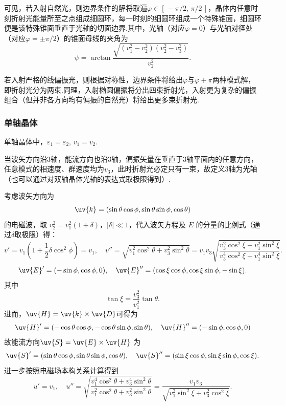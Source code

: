 可见，若入射自然光，则边界条件的解将取遍\(\varphi\in[\,-\pi/2,\,\pi/2\,]\)，晶体内任意时刻折射光能量所至之点组成细圆环，每一时刻的细圆环组成一个特殊锥面，细圆环便是该特殊锥面垂直于光轴的切面边界.其中，光轴（对应\(\varphi=0\)）与光轴对径处（对应\(\varphi=\pm\pi/2\)）的锥面母线的夹角为
\begin{equation*}
	\psi=\arctan\frac{\sqrt{(v_1^2 - v_2^2)(v_2^2 - v_3^2)}}{v_2^2 }.
\end{equation*}

若入射严格的线偏振光，则根据对称性，边界条件将给出\(\varphi\)与\(\varphi+\pi\)两种模式解，即折射光分为两束.同理，入射椭圆偏振将分出四束折射光，入射更为复杂的偏振组合（但并非各方向均有偏振的自然光）将给出更多束折射光.


\subsubsection{单轴晶体}

单轴晶体中，\(\varepsilon_1=\varepsilon_2,\, v_1=v_2\).

当波矢方向沿3轴，能流方向也沿3轴，偏振矢量在垂直于3轴平面内的任意方向，任意模式的相速度、群速度均为\(v_3\)，此时折射光必定只有一束，故定义3轴为光轴（也可以通过对双轴晶体光轴的表达式取极限得到）.

考虑波矢方向为
\begin{equation*}
	\uv{k} = (\sin\theta \cos\phi, \sin\theta \sin\phi, \cos\theta)
\end{equation*}
的电磁波，取 \(v_2^2 = v_1^2 (1 + \delta)\)，\(|\delta| \ll 1\)，代入波矢方程及 \(E\) 的分量的比例式（通过\(\delta\)取极限）得：
\begin{equation*}
	v' = v_1 \left(1 + \frac{1}{2} \delta \cos^2\phi\right) = v_1, \quad v'' = \sqrt{v_1^2 \cos^2\theta + v_3^2 \sin^2\theta} = v_1 v_3 \sqrt{\frac{v_3^2 \cos^2\xi + v_1^2 \sin^2\xi}{v_3^4 \cos^2\xi + v_1^4 \sin^2\xi}}.
\end{equation*}
\begin{equation*}
	\uv{E}' = (-\sin\phi, \cos\phi, 0), \quad \uv{E}'' = (\cos\xi \cos\phi, \cos\xi \sin\phi, -\sin\xi).
\end{equation*}
其中
\begin{equation*}
	\tan\xi = \frac{v_3^2}{v_1^2} \tan\theta.
\end{equation*}
进而，\(\uv{H}=\uv{k} \times \uv{D}\)可得为
\begin{equation*}
	\uv{H}' = (-\cos\theta \cos\phi, -\cos\theta \sin\phi, \sin\theta), \quad
	\uv{H}'' = (-\sin\phi, \cos\phi, 0)
\end{equation*}
故能流方向\(\uv{S}=\uv{E} \times \uv{H}\) 为
\begin{equation*}
	\uv{S}' = (\sin\theta \cos\phi, \sin\theta \sin\phi, \cos\theta), \quad \uv{S}'' = (\sin\xi \cos\phi, \sin\xi \sin\phi, \cos\xi).
\end{equation*}
进一步按照电磁场本构关系计算得到
\begin{equation*}
	u' = v_1, \quad u'' = \sqrt{\frac{v_1^4 \cos^2\theta + v_3^4 \sin^2\theta}{v_1^2 \cos^2\theta + v_3^2 \sin^2\theta}} = \frac{v_1 v_3}{\sqrt{v_1^2 \sin^2\xi + v_3^2 \cos^2\xi}}.
\end{equation*}

